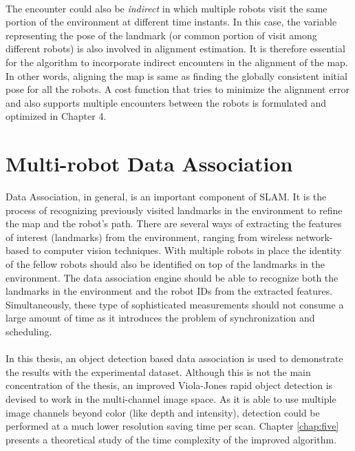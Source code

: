 \paragraph{}
The encounter could also be \textit{indirect} in which multiple robots visit the same portion of the environment at different time instants. In this case, the variable representing the pose of the landmark (or common portion of visit among different robots) is also involved in alignment estimation. It is therefore essential for the algorithm to incorporate indirect encounters in the alignment of the map. In other words, aligning the map is same as finding the globally consistent initial pose for all the robots. A cost function that tries to minimize the alignment error and also supports multiple encounters between the robots is formulated and optimized in Chapter 4.

\section{Multi-robot Data Association}
Data Association, in general, is an important component of SLAM. It is the process of recognizing previously visited landmarks in the environment to refine the map and the robot's path. There are several ways of extracting the features of interest (landmarks) from the environment, ranging from wireless network-based to computer vision techniques. With multiple robots in place the identity of the fellow robots should also be identified on top of the landmarks in the environment. The data association engine should be able to recognize both the landmarks in the environment and the robot IDs from the extracted features. Simultaneously, these type of sophisticated measurements should not consume a large amount of time as it introduces the problem of synchronization and scheduling.

\paragraph{}
In this thesis, an object detection based data association is used to demonstrate the results with the experimental dataset. Although this is not the main concentration of the thesis, an improved Viola-Jones rapid object detection \cite{violajones} is devised to work in the multi-channel image space. As it is able to use multiple image channels beyond color (like depth and intensity), detection could be performed at a much lower resolution saving time per scan. Chapter \ref{chap:five} presents a theoretical study of the time complexity of the improved algorithm.

